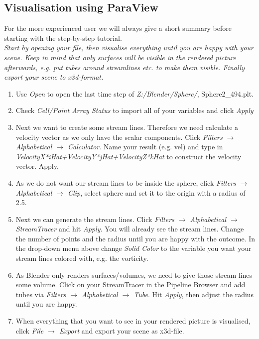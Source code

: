 \documentclass[11pt,twoside,a4paper]{fdyartcl}
\theoremstyle{myPlain}
\theoremstyle{myDefinition}
\begin{document}
\subsection{Visualisation using ParaView}
For the more experienced user we will always give a short summary before starting with the step-by-step tutorial.\\
\textit{Start by opening your file, then visualise everything until you are happy with your scene. Keep in mind that only surfaces will be visible in the rendered picture afterwards, e.g. put tubes around streamlines etc. to make them visible. Finally export your scene to x3d-format.}
\begin{enumerate}
	\item Use \textit{Open} to open the last time step of \textit{Z:/Blender/Sphere/}, Sphere2\_494.plt.
	\item Check \textit{Cell/Point Array Status} to import all of your variables and click \textit{Apply}
	\item Next we want to create some stream lines. Therefore we need calculate a velocity vector as we only have the scalar components. Click \textit{Filters $\rightarrow$ Alphabetical $\rightarrow$ Calculator}. Name your result (e.g. vel) and type in \textit{VelocityX*iHat+VelocityY*jHat+VelocityZ*kHat} to construct the velocity vector. Apply.
	\item As we do not want our stream lines to be inside the sphere, click \textit{Filters $\rightarrow$ Alphabetical $\rightarrow$ Clip}, select sphere and set it to the origin with a radius of 2.5.
	\item Next we can generate the stream lines. Click \textit{Filters $\rightarrow$ Alphabetical $\rightarrow$ StreamTracer} and hit \textit{Apply}. You will already see the stream lines. Change the number of points and the radius until you are happy with the outcome. In the drop-down menu above change \textit{Solid Color} to the variable you want your stream lines colored with, e.g. the vorticity.
	\item As Blender only renders surfaces/volumes, we need to give those stream lines some volume. Click on your StreamTracer in the Pipeline Browser and add tubes via \textit{Filters $\rightarrow$ Alphabetical $\rightarrow$ Tube}. Hit \textit{Apply}, then adjust the radius until you are happy.
	\item When everything that you want to see in your rendered picture is visualised, click \textit{File $\rightarrow$ Export} and export your scene as x3d-file.
\end{enumerate}
	
\end{document}
